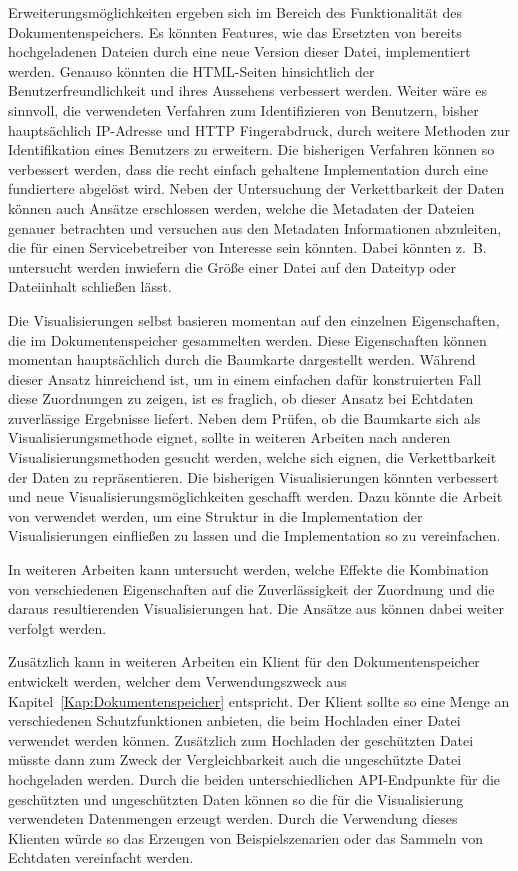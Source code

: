 \documentclass[
    fontsize=12pt,
    headings=small,
    parskip=half,           %
    bibliography=totoc,
    numbers=noenddot,       %
    open=any,               %
    ]{scrreprt}
\begin{document}
Erweiterungsmöglichkeiten ergeben sich im Bereich des Funktionalität des Dokumentenspeichers.
Es könnten Features, wie das Ersetzten von bereits hochgeladenen Dateien durch eine neue Version dieser Datei, implementiert werden.
Genauso könnten die HTML-Seiten hinsichtlich der Benutzerfreundlichkeit und ihres Aussehens verbessert werden. 
Weiter wäre es sinnvoll, die verwendeten Verfahren zum Identifizieren von Benutzern, bisher hauptsächlich IP-Adresse und HTTP Fingerabdruck, durch weitere Methoden zur Identifikation eines Benutzers zu erweitern.
Die bisherigen Verfahren können so verbessert werden, dass die recht einfach gehaltene Implementation durch eine fundiertere abgelöst wird. 
Neben der Untersuchung der Verkettbarkeit der Daten können auch Ansätze erschlossen werden, welche die Metadaten der Dateien genauer betrachten und versuchen aus den Metadaten Informationen abzuleiten, die für einen Servicebetreiber von Interesse sein könnten.
Dabei könnten z.~B. untersucht werden inwiefern die Größe einer Datei auf den Dateityp oder Dateiinhalt schließen lässt.

Die Visualisierungen selbst basieren momentan auf den einzelnen Eigenschaften, die im Dokumentenspeicher gesammelten werden. 
Diese Eigenschaften können momentan hauptsächlich durch die Baumkarte dargestellt werden.
Während dieser Ansatz hinreichend ist, um in einem einfachen dafür konstruierten Fall diese Zuordnungen zu zeigen, ist es fraglich, ob dieser Ansatz bei Echtdaten zuverlässige Ergebnisse liefert.
Neben dem Prüfen, ob die Baumkarte sich als Visualisierungsmethode eignet, sollte in weiteren Arbeiten nach anderen Visualisierungsmethoden gesucht werden, welche sich eignen, die Verkettbarkeit der Daten zu repräsentieren.
Die bisherigen Visualisierungen könnten verbessert und neue Visualisierungsmöglichkeiten geschafft werden. 
Dazu könnte die Arbeit von \textcite{Chi} verwendet werden, um eine Struktur in die Implementation der Visualisierungen einfließen zu lassen und die Implementation so zu vereinfachen.

In weiteren Arbeiten kann untersucht werden, welche Effekte die Kombination von verschiedenen Eigenschaften auf die Zuverlässigkeit der Zuordnung und die daraus resultierenden Visualisierungen hat. 
Die Ansätze aus \cite{Ecke10} können dabei weiter verfolgt werden.

Zusätzlich kann in weiteren Arbeiten ein Klient für den Dokumentenspeicher entwickelt werden, welcher dem Verwendungszweck aus Kapitel~\ref{Kap:Dokumentenspeicher} entspricht.
Der Klient sollte so eine Menge an verschiedenen Schutzfunktionen anbieten, die beim Hochladen einer Datei verwendet werden können.
Zusätzlich zum Hochladen der geschützten Datei müsste dann zum Zweck der Vergleichbarkeit auch die ungeschützte Datei hochgeladen werden.
Durch die beiden unterschiedlichen API-Endpunkte für die geschützten und ungeschützten Daten können so die für die Visualisierung verwendeten Datenmengen erzeugt werden.
Durch die Verwendung dieses Klienten würde so das Erzeugen von Beispielszenarien oder das Sammeln von Echtdaten vereinfacht werden.

\printbibliography
\end{document}
